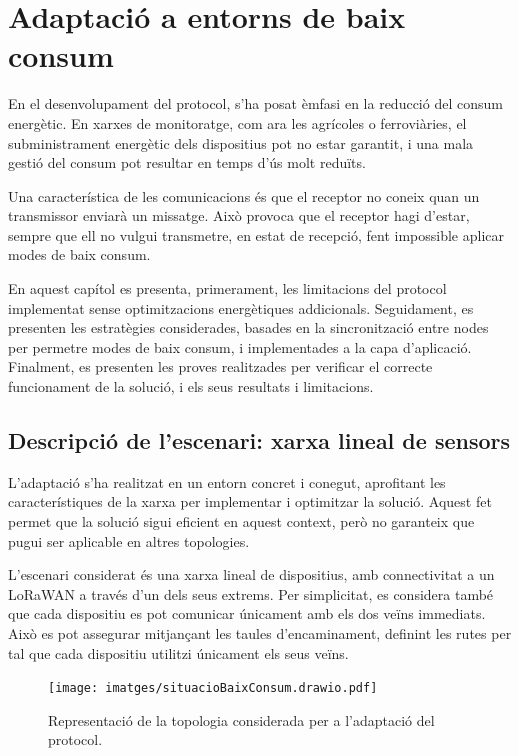 \documentclass{tfgitic}[2024/07/01]
\begin{document}
{\chapter{Adaptació a entorns de baix consum}
\label{chap:adaptacio_baix_consum}
En el desenvolupament del protocol, s'ha posat èmfasi en la reducció del consum energètic. En xarxes de monitoratge, com ara les agrícoles o ferroviàries, el subministrament energètic dels dispositius pot no estar garantit, i una mala gestió del consum pot resultar en temps d'ús molt reduïts.

Una característica de les comunicacions és que el receptor no coneix quan un transmissor enviarà un missatge. Això provoca que el receptor hagi d'estar, sempre que ell no vulgui transmetre, en estat de recepció, fent impossible aplicar modes de baix consum.

En aquest capítol es presenta, primerament, les limitacions del protocol implementat sense optimitzacions energètiques addicionals. Seguidament, es presenten les estratègies considerades, basades en la sincronització entre nodes per permetre modes de baix consum, i implementades a la capa d'aplicació. Finalment, es presenten les proves realitzades per verificar el correcte funcionament de la solució, i els seus resultats i limitacions.

\section{Descripció de l'escenari: xarxa lineal de sensors}
L'adaptació s'ha realitzat en un entorn concret i conegut, aprofitant les característiques de la xarxa per implementar i optimitzar la solució. Aquest fet permet que la solució sigui eficient en aquest context, però no garanteix que pugui ser aplicable en altres topologies. 

L'escenari considerat és una xarxa lineal de dispositius, amb connectivitat a un  LoRaWAN a través d'un dels seus extrems. Per simplicitat, es considera també que cada dispositiu es pot comunicar únicament amb els dos veïns immediats. Això es pot assegurar mitjançant les taules d'encaminament, definint les rutes per tal que cada dispositiu utilitzi únicament els seus veïns. 

\begin{figure}
    \centering
    \texttt{[image: imatges/situacioBaixConsum.drawio.pdf]}
    \caption{Representació de la topologia considerada per a l'adaptació del protocol.}
    \label{fig:topologia_baix_consum}
\end{figure}

}
\end{document}
